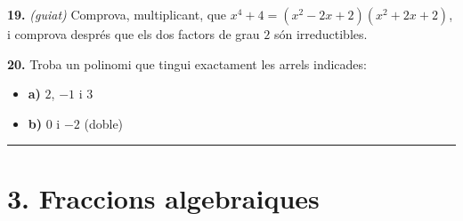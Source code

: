 \documentclass[13pt,a4paper]{extarticle}
\begin{document}
\par\noindent\begin{minipage}{\linewidth}
\textbf{19.} \emph{(guiat)} Comprova, multiplicant, que $x^4+4=(x^2-2x+2)(x^2+2x+2)$, i comprova després que els dos factors de grau $2$ són irreductibles.\par
\end{minipage}\par\vspace{1.6mm}
\par\noindent\begin{minipage}{\linewidth}
\textbf{20.} Troba un polinomi que tingui exactament les arrels indicades:\par

\begin{itemize}[leftmargin=0pt,itemsep=3pt,topsep=3pt,parsep=0pt,label={}]
\item \textbf{a)} $2$, $-1$ i $3$
\item \textbf{b)} $0$ i $-2$ (doble)
\end{itemize}
\end{minipage}\par\vspace{1.6mm}
\vspace{1mm}\hrule\vspace{3mm}

\section*{3. Fraccions algebraiques}
\end{document}
